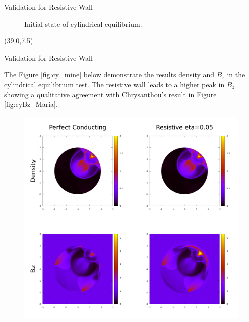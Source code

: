 \documentclass[final]{beamer}
\begin{document}
\begin{frame}{}
\begin{textblock}{19.0}
\begin{block}{Validation for Resistive Wall}
\begin{minipage}{0.90\linewidth}
\begin{figure}
	\begin{minipage}{1.0\textwidth}
		\caption{Initial state of cylindrical equilibrium.}
		\label{fig:InCy}
	\end{minipage}
	\end{figure}
\end{minipage}
\end{block}

\end{textblock}


\begin{textblock}{19.0}(39.0,7.5)
\begin{block}{Validation for Resistive Wall}
	\begin{minipage}{0.93\linewidth}
		\justifying
		The Figure \ref{fig:cy_mine} below demonstrate the results density and $B_z$ in the cylindrical equilibrium test. The resistive wall leads to a higher peak in $B_z$ showing a qualitative agreement with Chrysanthou's result \cite{chrysanthou2020} in Figure \ref{fig:cyBz_Maria}.
		\vspace{0.3cm}
		
		\begin{figure}
			\begin{minipage}{0.90\linewidth}
				\includegraphics[width=\textwidth]{cylindricalEquilibrium.png}
			\end{minipage}
			

\end{figure}
\end{minipage}
\end{block}
\end{textblock}
\end{frame}
\end{document}
